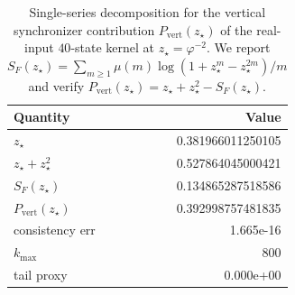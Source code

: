 \begin{table}[H]
\centering
\scriptsize
\setlength{\tabcolsep}{6pt}
\caption{Single-series decomposition for the vertical synchronizer contribution $P_{\mathrm{vert}}(z_\star)$ of the real-input $40$-state kernel at $z_\star=\varphi^{-2}$. We report $S_F(z_\star)=\sum_{m\ge 1}\mu(m)\log(1+z_\star^m-z_\star^{2m})/m$ and verify $P_{\mathrm{vert}}(z_\star)=z_\star+z_\star^2-S_F(z_\star)$.}
\label{tab:real_input_40_vert_single_series}
\begin{tabular}{l r}
\toprule
Quantity & Value\\
\midrule
$z_\star$ & 0.381966011250105\\
$z_\star+z_\star^2$ & 0.527864045000421\\
$S_F(z_\star)$ & 0.134865287518586\\
$P_{\mathrm{vert}}(z_\star)$ & 0.392998757481835\\
consistency err & 1.665e-16\\
$k_\max$ & 800\\
tail proxy & 0.000e+00\\
\bottomrule
\end{tabular}
\end{table}
